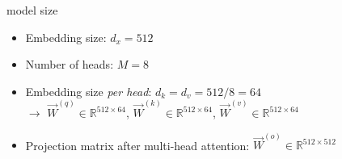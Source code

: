 
\begin{vbframe}{model size}

\vfill

\begin{itemize}
\item Embedding size: $d_x = 512$
\item Number of heads: $M = 8$
\item Embedding size \textit{per head}: $d_k = d_v = 512/8 = 64$\\\medskip
			$\to$ $\vec W^{(q)} \in \mathbb{R}^{512 \times 64}$, $\vec W^{(k)} \in \mathbb{R}^{512 \times 64}$, $\vec W^{(v)} \in \mathbb{R}^{512 \times 64}$
\item Projection matrix after multi-head attention: $\vec W^{(o)} \in \mathbb{R}^{512 \times 512}$
\end{itemize}

\vfill

\end{vbframe}


\endlecture
